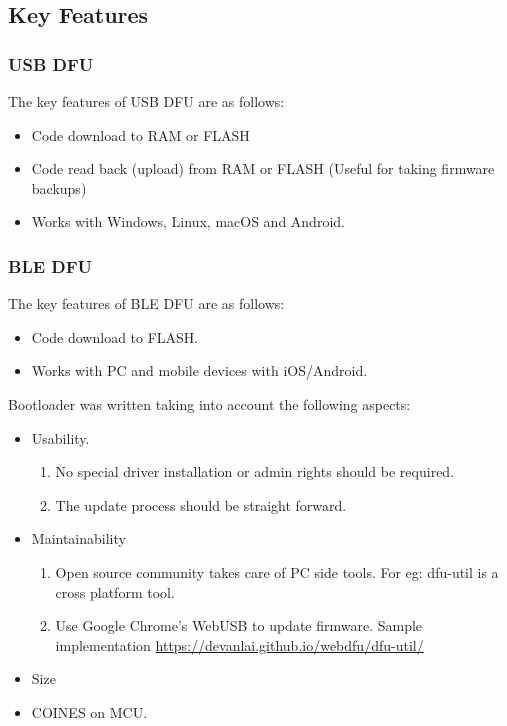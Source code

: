 \documentclass[11pt,headings=small]{scrartcl}
\begin{document}
\subsection{Key Features}

\subsubsection{USB DFU}
The key features of USB DFU are as follows:
\begin{itemize}
	\item Code download to RAM or FLASH
	\item Code read back (upload) from  RAM or FLASH (Useful for taking firmware backups)
	\item Works with Windows, Linux, macOS and Android.
\end{itemize}

\subsubsection{BLE DFU}
The key features of BLE DFU are as follows:
\begin{itemize}
	\item Code download to FLASH.
	\item Works with PC and mobile devices with iOS/Android.
\end{itemize}

Bootloader was written taking into account the following aspects:
\begin{itemize}
	\item Usability.
	\begin{enumerate}[label=\roman*.]
		\item No special driver installation or admin rights should be required.
		\item The update process should be straight forward.
	\end{enumerate}
	\item Maintainability
	\begin{enumerate}[label=\roman*.]
		\item Open source community takes care of PC side tools. For eg: dfu-util is a cross platform tool.
		\item Use Google Chrome's WebUSB to update firmware. Sample implementation \url{https://devanlai.github.io/webdfu/dfu-util/}
	\end{enumerate}
	\item Size
	\item COINES on MCU.
\end{itemize}
\end{document}
